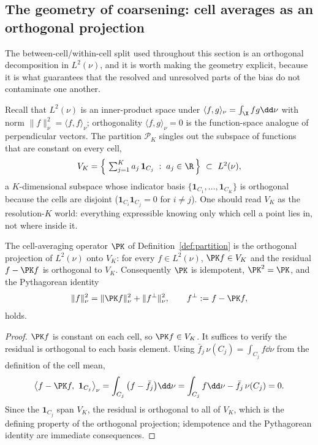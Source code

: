 \subsection{The geometry of coarsening: cell averages as an orthogonal
projection}
\label{sec:projection-geometry}

The between-cell/within-cell split used throughout this section is an
orthogonal decomposition in $L^2(\nu)$, and it is worth making the
geometry explicit, because it is what guarantees that the resolved and
unresolved parts of the bias do not contaminate one another.

Recall that $L^2(\nu)$ is an inner-product space under
$\langle f,g\rangle_\nu=\int_\X fg\dd\nu$ with norm
$\|f\|_\nu^2=\langle f,f\rangle_\nu$; orthogonality
$\langle f,g\rangle_\nu=0$ is the function-space analogue of
perpendicular vectors. The partition $\mathcal{P}_K$ singles out the
subspace of functions that are constant on every cell,
\[
  V_K=\Big\{\,\textstyle\sum_{j=1}^{K} a_j\,\mathbf{1}_{C_j}
      \;:\; a_j\in\R\,\Big\}\ \subset\ L^2(\nu),
\]
a $K$-dimensional subspace whose indicator basis
$\{\mathbf{1}_{C_1},\dots,\mathbf{1}_{C_K}\}$ is orthogonal because the
cells are disjoint ($\mathbf{1}_{C_i}\mathbf{1}_{C_j}=0$ for $i\ne j$).
One should read $V_K$ as the resolution-$K$ world: everything
expressible knowing only which cell a point lies in, not where inside
it.

\begin{lemma}
\label{lem:projection}
The cell-averaging operator $\PK$ of Definition~\ref{def:partition} is
the orthogonal projection of $L^2(\nu)$ onto $V_K$: for every
$f\in L^2(\nu)$, $\PK f\in V_K$ and the residual $f-\PK f$ is orthogonal
to $V_K$. Consequently $\PK$ is idempotent, $\PK^2=\PK$, and the
Pythagorean identity
\[
  \|f\|_\nu^2=\|\PK f\|_\nu^2+\|f^{\perp}\|_\nu^2,
  \qquad f^{\perp}:=f-\PK f,
\]
holds.
\end{lemma}

\begin{proof}
$\PK f$ is constant on each cell, so $\PK f\in V_K$. It suffices to
verify the residual is orthogonal to each basis element. Using
$\bar f_j\,\nu(C_j)=\int_{C_j}f\dd\nu$ from the definition of the cell
mean,
\[
  \big\langle f-\PK f,\ \mathbf{1}_{C_j}\big\rangle_\nu
  =\int_{C_j}\big(f-\bar f_j\big)\dd\nu
  =\int_{C_j}f\dd\nu-\bar f_j\,\nu(C_j)=0 .
\]
Since the $\mathbf{1}_{C_j}$ span $V_K$, the residual is orthogonal to
all of $V_K$, which is the defining property of the orthogonal
projection; idempotence and the Pythagorean identity are immediate
consequences.
\end{proof}


